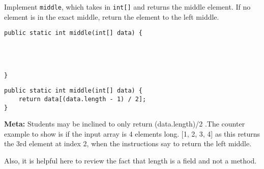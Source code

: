 \begin{blocksection}
\question Implement \lstinline$middle$, which takes in \lstinline$int[]$ and
returns the middle element. If no element is in the exact middle, return the
element to the left middle.

\ifprintanswers\else
\begin{lstlisting}
public static int middle(int[] data) {




}
\end{lstlisting}
\fi

\begin{solution}
\begin{lstlisting}
public static int middle(int[] data) {
    return data[(data.length - 1) / 2];
}
\end{lstlisting}

\textbf{Meta:} Students may be inclined to only return (data.length)/2 .The counter example to show is if the input array is 4 elements long. [1, 2, 3, 4] as this returns the 3rd element at index 2, when the instructions say to return the left middle.

Also, it is helpful here to review the fact that length is a field and
not a method. 
\end{solution}
\end{blocksection}
